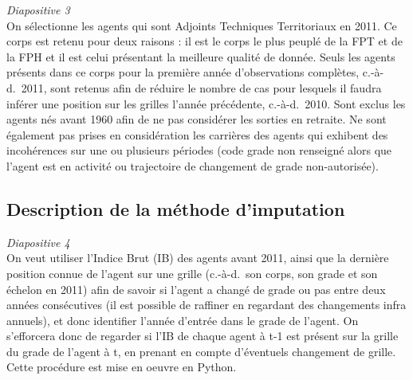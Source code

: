 \documentclass[11pt,a4paper]{article}
\begin{document}
\textit{Diapositive 3}\\

On sélectionne les agents qui sont Adjoints Techniques Territoriaux en 2011. Ce corps est retenu pour deux raisons : il est le corps le plus peuplé de la FPT et de la FPH et il est celui présentant la meilleure qualité de donnée. Seuls les agents présents dans ce corps pour la première année d'observations complètes, c.-à-d.~2011, sont retenus afin de réduire le nombre de cas pour lesquels il faudra inférer une position sur les grilles l'année précédente, c.-à-d.~2010. Sont exclus les agents nés avant 1960 afin de ne pas considérer les sorties en retraite. Ne sont également pas prises en considération les carrières des agents qui exhibent des incohérences sur une ou plusieurs périodes (code grade non renseigné alors que l'agent est en activité ou trajectoire de changement de grade non-autorisée).

\subsection{Description de la méthode d'imputation}

\textit{Diapositive 4}\\

On veut utiliser l'Indice Brut (IB) des agents avant 2011, ainsi que la dernière position connue de l'agent sur une grille (c.-à-d.~son corps, son grade et son échelon en 2011) afin de savoir si l'agent a changé de grade ou pas entre deux années consécutives (il est possible de raffiner en regardant des changements infra annuels), et donc identifier l'année d'entrée dans le grade de l'agent.
On s'efforcera donc de regarder si l'IB de chaque agent à t-1 est présent sur la grille du grade de l'agent à t, en prenant en compte d'éventuels changement de grille. Cette procédure est mise en oeuvre en Python.\\
\end{document}
